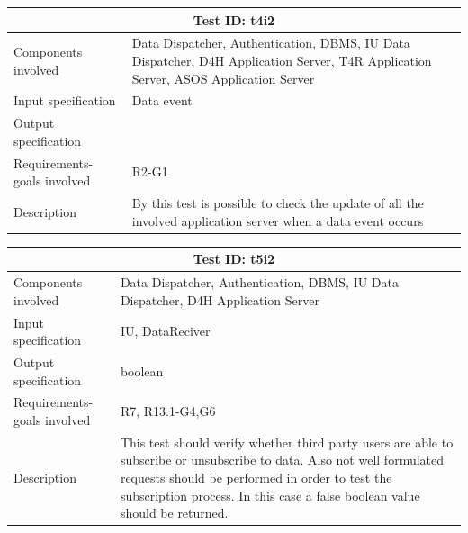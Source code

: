 \begin{table}[H]
\centering
\begin{tabular}{ |p{4.5cm}||p{11cm}|  }
 \hline
 \multicolumn{2}{|c|}{Test ID: t4i2} \\
 
 \hline 
 Components involved  	&  Data Dispatcher, Authentication, DBMS, IU Data Dispatcher, D4H Application Server, T4R Application Server, ASOS Application Server  \\
 Input specification  	&  	 Data event\\
Output specification  	& 	 \\
Requirements-goals involved &    R2-G1\\
Description  	& By this test is possible to check the update of all the involved application server when a data event occurs\\
 \hline
\end{tabular}
\end{table}

\begin{table}[H]
\centering
\begin{tabular}{ |p{4.5cm}||p{11cm}|  }
 \hline
 \multicolumn{2}{|c|}{Test ID: t5i2} \\
 
 \hline 
 Components involved  	&  Data Dispatcher, Authentication, DBMS, IU Data Dispatcher, D4H Application Server\\
 Input specification  	&  	IU, DataReciver \\
Output specification  	& 	  	boolean\\
Requirements-goals involved &     R7, R13.1-G4,G6\\
Description  	& This test should verify whether third party users are able to subscribe or unsubscribe to data. Also not well formulated requests should be performed in order to test the subscription process. In this case a false boolean value should be returned.\\
 \hline
\end{tabular}
\end{table}


